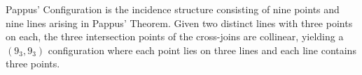 Pappus' Configuration is the incidence structure consisting of nine points and nine lines arising in Pappus' Theorem. Given two distinct lines with three points on each, the three intersection points of the cross-joins are collinear, yielding a $(9_3, 9_3)$ configuration where each point lies on three lines and each line contains three points.
